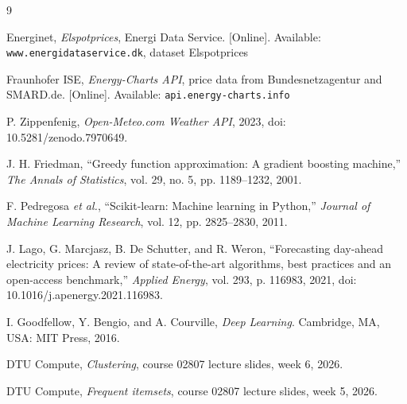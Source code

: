 \begin{thebibliography}{9}

Energinet, \emph{Elspotprices}, Energi Data Service.
[Online]. Available: \texttt{www.energidataservice.dk}, dataset Elspotprices

Fraunhofer ISE, \emph{Energy-Charts API}, price data from Bundesnetzagentur and SMARD.de.
[Online]. Available: \texttt{api.energy-charts.info}

P. Zippenfenig, \emph{Open-Meteo.com Weather API}, 2023,
doi: 10.5281/zenodo.7970649.

J. H. Friedman, ``Greedy function approximation: A gradient boosting machine,''
\emph{The Annals of Statistics}, vol. 29, no. 5, pp. 1189--1232, 2001.

F. Pedregosa \emph{et al.}, ``Scikit-learn: Machine
learning in Python,'' \emph{Journal of Machine Learning Research}, vol. 12,
pp. 2825--2830, 2011.

J. Lago, G. Marcjasz, B. De Schutter, and R. Weron,
``Forecasting day-ahead electricity prices: A review of state-of-the-art
algorithms, best practices and an open-access benchmark,'' \emph{Applied
Energy}, vol. 293, p. 116983, 2021, doi: 10.1016/j.apenergy.2021.116983.

I. Goodfellow, Y. Bengio, and A. Courville,
\emph{Deep Learning}. Cambridge, MA, USA: MIT Press, 2016.

DTU Compute, \emph{Clustering}, course 02807 lecture slides, week 6, 2026.

DTU Compute, \emph{Frequent itemsets}, course 02807 lecture slides, week 5, 2026.

\end{thebibliography}
